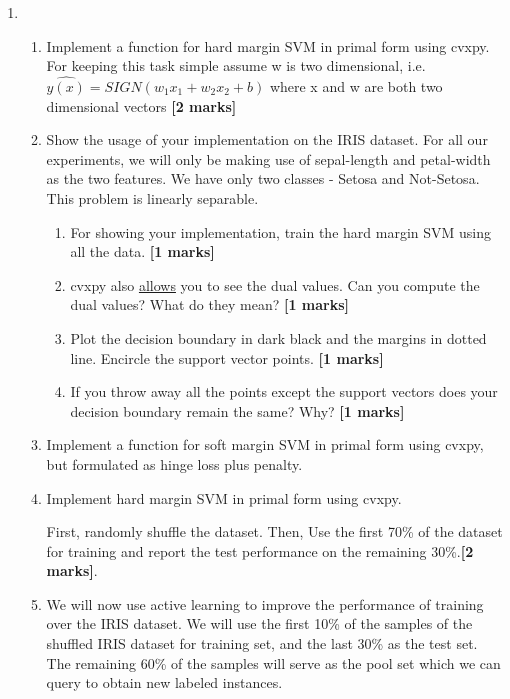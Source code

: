 \documentclass[colorlinks,linkcolor=true]{article}
\begin{document}
\begin{enumerate}


\item \begin{enumerate}
	
\item Implement a function for hard margin SVM in primal form using cvxpy. For keeping this task simple assume w is two dimensional, i.e. $\hat{y(x)} = SIGN(w_1x_1 + w_2x_2 + b)$ where x and w are both two dimensional vectors \textbf{[2 marks]}
\item Show the usage of your implementation on the IRIS dataset. For all our experiments, we will only be making use of sepal-length and petal-width as the two features. We have only two classes - Setosa and Not-Setosa. This problem is linearly separable. \begin{enumerate}
	\item  For showing your implementation, train the hard margin SVM using all the data. \textbf{[1 marks]}
	\item cvxpy also \href{https://www.cvxpy.org/tutorial/advanced/index.html}{allows} you to see the dual values. Can you compute the dual values? What do they mean? \textbf{[1 marks]}
	\item Plot the decision boundary in dark black and the margins in dotted line. Encircle the support vector points. \textbf{[1 marks]}
	\item If you throw away all the points except the support vectors does your decision boundary remain the same? Why? \textbf{[1 marks]}
\end{enumerate}

\item Implement a function for soft margin SVM in primal form using cvxpy, but formulated as hinge loss plus penalty. 


	
\item 	Implement hard margin SVM in primal form using cvxpy. 



First, randomly shuffle the dataset. Then, Use the first 70\% of the dataset for training and report the test performance on the remaining 30\%.\textbf{[2 marks]}.

\item We will now use active learning to improve the performance of training over the IRIS dataset. We will use the first 10\% of the samples of the shuffled IRIS dataset for training set, and the last 30\% as the test set. The remaining 60\% of the samples will serve as the pool set which we can query to obtain new labeled instances.


\end{enumerate}
\end{enumerate}
\end{document}
